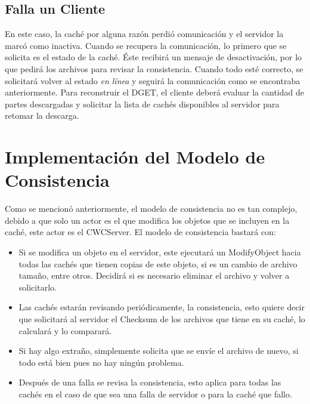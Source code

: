 \subsection{Falla un Cliente}
En este caso, la caché por alguna razón perdió comunicación y el servidor la marcó como inactiva. Cuando se recupera la comunicación, lo primero que se solicita es el estado de la caché. Éste recibirá un mensaje de desactivación, por lo que pedirá los archivos para revisar la consistencia. Cuando todo esté correcto, se solicitará volver al estado \textit{en línea} y seguirá la comunicación como se encontraba anteriormente.
Para reconstruir el DGET, el cliente deberá evaluar la cantidad de partes descargadas y solicitar la lista de cachés disponibles al servidor para retomar la descarga.

\section{Implementación del Modelo de Consistencia}
Como se mencionó anteriormente, el modelo de consistencia no es tan complejo, debido a que solo un actor es el que modifica los objetos que se incluyen en la caché, este actor es el CWCServer. El modelo de consistencia bastará con:

\begin{itemize}
\item Si se modifica un objeto en el servidor, este ejecutará un ModifyObject hacia todas las cachés que tienen copias de este objeto, si es un cambio de archivo tamaño, entre otros. Decidirá si es necesario eliminar el archivo y volver a solicitarlo.
\item Las cachés estarán revisando periódicamente, la consistencia, esto quiere decir que solicitará al servidor el Checksum de los archivos que tiene en su caché, lo calculará y lo comparará.
\item Si hay algo extraño, simplemente solicita que se envíe el archivo de nuevo, si todo está bien pues no hay ningún problema.
\item Después de una falla se revisa la consistencia, esto aplica para todas las cachés en el caso de que sea una falla de servidor o para la caché que fallo.
\end{itemize}